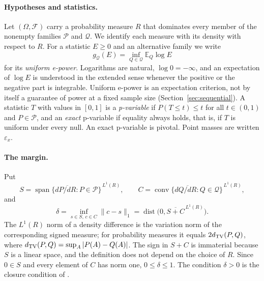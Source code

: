 \documentclass[11pt,a4paper]{article}
\theoremstyle{definition}
\theoremstyle{remark}
\newcommand{\PP}{\mathcal P}
\newcommand{\QQ}{\mathcal Q}
\newcommand{\EE}{\mathbb E}
\newcommand{\conv}{\operatorname{conv}}
\newcommand{\spn}{\operatorname{span}}
\newcommand{\dist}{\operatorname{dist}}
\newcommand{\pt}{\varepsilon}
\begin{document}
\paragraph{Hypotheses and statistics.}
Let \((\Omega,\mathcal F)\) carry a probability measure \(R\) that dominates every member of the nonempty families \(\PP\) and \(\QQ\). We identify each measure with its density with respect to \(R\). For a statistic \(E\ge0\) and an alternative family we write
\[
 g_{\QQ}(E)=\inf_{Q\in\QQ}\EE_Q\log E
\]
for its \emph{uniform e-power}. Logarithms are natural, \(\log0=-\infty\), and an expectation of \(\log E\) is understood in the extended sense whenever the positive or the negative part is integrable. Uniform e-power is an expectation criterion, not by itself a guarantee of power at a fixed sample size (Section~\ref{sec:sequential}). A statistic \(T\) with values in \([0,1]\) is a \emph{p-variable} if \(P(T\le t)\le t\) for all \(t\in(0,1)\) and \(P\in\PP\), and an \emph{exact} p-variable if equality always holds, that is, if \(T\) is uniform under every null. An exact p-variable is pivotal. Point masses are written \(\pt_x\).

\paragraph{The margin.}
Put
\begin{equation}\label{eq:SC}
 S=\overline{\spn\{dP/dR:P\in\PP\}}^{\,L^1(R)},\qquad
 C=\overline{\conv\{dQ/dR:Q\in\QQ\}}^{\,L^1(R)},
\end{equation}
and
\begin{equation}\label{eq:delta}
 \delta=\inf_{s\in S,\,c\in C}\|c-s\|_1=\dist\bigl(0,\overline{S+C}^{\,L^1(R)}\bigr).
\end{equation}
The \(L^1(R)\) norm of a density difference is the variation norm of the corresponding signed measure; for probability measures it equals \(2d_{\rm TV}(P,Q)\), where \(d_{\rm TV}(P,Q)=\sup_A|P(A)-Q(A)|\). The sign in \(S+C\) is immaterial because \(S\) is a linear space, and the definition does not depend on the choice of \(R\). Since \(0\in S\) and every element of \(C\) has norm one, \(0\le\delta\le1\). The condition \(\delta>0\) is the closure condition of \cite[Theorem~6.8 and Conjecture~6.9]{ZRW}.
\end{document}
